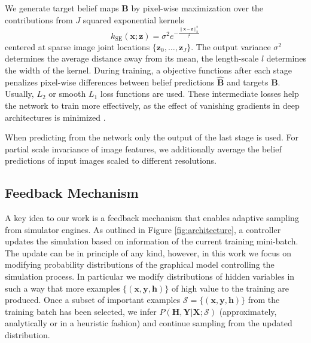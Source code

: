 \documentclass[conference]{IEEEtran}
\begin{document}
    We generate target belief maps $\mathbf{B}$ by pixel-wise maximization over the contributions from $J$ squared exponential kernels
    \begin{equation}
        k_{\textrm{SE}}(\mathbf{x};\mathbf{z}) = \sigma^2e^{-\frac{\lVert \mathbf{x} - \mathbf{z} \rVert^2_2}{l^2}}
    \end{equation}
    centered at sparse image joint locations $\{\mathbf{z}_0,\ldots,\mathbf{z}_J\}$. The output variance $\sigma^2$ determines the average distance away from its mean, the length-scale $l$ determines the width of the kernel. During training, a objective functions after each stage penalizes pixel-wise differences between belief predictions $\hat{\mathbf{B}}$ and targets $\mathbf{B}$. Usually, $L_2$ or smooth $L_1$ loss functions are used. These intermediate losses help the network to train more effectively, as the effect of vanishing gradients in deep architectures is minimized \cite{newell2016stacked, wei2016convolutional}. 
    
    When predicting from the network only the output of the last stage is used. For partial scale invariance of image features, we additionally average the belief predictions of input images scaled to different resolutions.

\subsection{Feedback Mechanism}
    \label{sec:feedback}
    A key idea to our work is a feedback mechanism that enables adaptive sampling from simulator engines. As outlined in Figure \ref{fig:architecture}, a controller updates the simulation based on information of the current training mini-batch. The update can be in principle of any kind, however, in this work we focus on modifying probability distributions of the graphical model controlling the simulation process. In particular we modify distributions of hidden variables in such a way that more examples $\{(\textbf{x},\textbf{y},\textbf{h})\}$ of high value to the training are produced. Once a subset of important examples $\mathcal{S} = \{(\textbf{x},\textbf{y},\textbf{h})\}$ from the training batch has been selected, we infer $P(\textbf{H},\textbf{Y} \lvert \textbf{X};\mathcal{S})$ (approximately, analytically or in a heuristic fashion) and continue sampling from the updated distribution.
\end{document}
